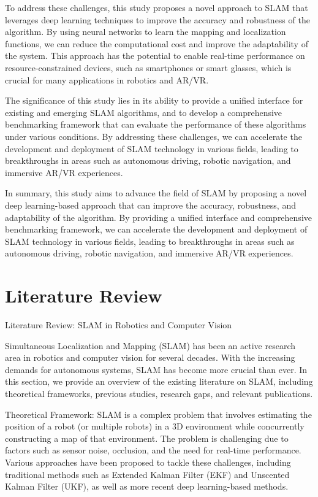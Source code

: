 \documentclass[conference]{IEEEtran}
\begin{document}
To address these challenges, this study proposes a novel approach to SLAM that leverages deep learning techniques to improve the accuracy and robustness of the algorithm. By using neural networks to learn the mapping and localization functions, we can reduce the computational cost and improve the adaptability of the system. This approach has the potential to enable real-time performance on resource-constrained devices, such as smartphones or smart glasses, which is crucial for many applications in robotics and AR/VR.

The significance of this study lies in its ability to provide a unified interface for existing and emerging SLAM algorithms, and to develop a comprehensive benchmarking framework that can evaluate the performance of these algorithms under various conditions. By addressing these challenges, we can accelerate the development and deployment of SLAM technology in various fields, leading to breakthroughs in areas such as autonomous driving, robotic navigation, and immersive AR/VR experiences.

In summary, this study aims to advance the field of SLAM by proposing a novel deep learning-based approach that can improve the accuracy, robustness, and adaptability of the algorithm. By providing a unified interface and comprehensive benchmarking framework, we can accelerate the development and deployment of SLAM technology in various fields, leading to breakthroughs in areas such as autonomous driving, robotic navigation, and immersive AR/VR experiences.

\section{Literature Review}
Literature Review: SLAM in Robotics and Computer Vision

Simultaneous Localization and Mapping (SLAM) has been an active research area in robotics and computer vision for several decades. With the increasing demands for autonomous systems, SLAM has become more crucial than ever. In this section, we provide an overview of the existing literature on SLAM, including theoretical frameworks, previous studies, research gaps, and relevant publications.

Theoretical Framework:
SLAM is a complex problem that involves estimating the position of a robot (or multiple robots) in a 3D environment while concurrently constructing a map of that environment. The problem is challenging due to factors such as sensor noise, occlusion, and the need for real-time performance. Various approaches have been proposed to tackle these challenges, including traditional methods such as Extended Kalman Filter (EKF) and Unscented Kalman Filter (UKF), as well as more recent deep learning-based methods.
\end{document}
